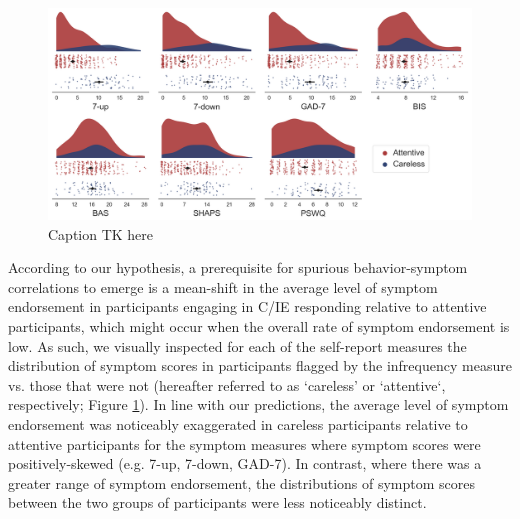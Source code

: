 \documentclass[a4paper,notitlepage,12pt]{article}
\begin{document}
\begin{figure}[t!]
\includegraphics[width=16cm]{../figures/main_02a.png}
\centering
\caption{Caption TK here}
\label{fig:distributions}
\end{figure}

According to our hypothesis, a prerequisite for spurious behavior-symptom correlations to emerge is a mean-shift in the average level of symptom endorsement in participants engaging in C/IE responding relative to attentive participants, which might occur when the overall rate of symptom endorsement is low. As such, we visually inspected for each of the self-report measures the distribution of symptom scores in participants flagged by the infrequency measure vs. those that were not (hereafter referred to as `careless' or `attentive`, respectively; Figure \ref{fig:distributions}). In line with our predictions, the average level of symptom endorsement was noticeably exaggerated in careless participants relative to attentive participants for the symptom measures where symptom scores were positively-skewed (e.g. 7-up, 7-down, GAD-7). In contrast, where there was a greater range of symptom endorsement, the distributions of symptom scores between the two groups of participants were less noticeably distinct. 
\end{document}
